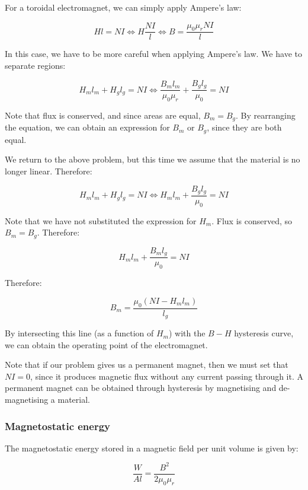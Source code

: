 \documentclass{article}
\begin{document}
\begin{example}
    For a toroidal electromagnet, we can simply apply Ampere's law:

    \[ Hl = NI \iff H \frac{NI}{l} \iff B = \frac{\mu_0\mu_r NI}{l} \]
\end{example}

\begin{example}
    In this case, we have to be more careful when applying Ampere's law. We have to separate regions:

    \[ H_ml_m + H_gl_g = NI \iff \frac{B_m l_m}{\mu_0\mu_r} + \frac{B_g l_g}{\mu_0} = NI \]

    Note that flux is conserved, and since areas are equal, $B_m = B_g$. By rearranging the equation, we can obtain an expression for $B_m$ or $B_g$, since they are both equal.
\end{example}

\begin{example}
    We return to the above problem, but this time we assume that the material is no longer linear. Therefore:

    \[ H_m l_m + H_g l_g = NI \iff H_m l_m + \frac{B_g l_g}{\mu_0} = NI \]

    Note that we have not substituted the expression for $H_m$. Flux is conserved, so $B_m = B_g$. Therefore:

    \[ H_m l_m + \frac{B_m l_g}{\mu_0} = NI \]

    Therefore:

    \[ B_m = \frac{\mu_0(NI - H_m l_m)}{l_g} \]

    By intersecting this line (as a function of $H_m$) with the $B-H$ hysteresis curve, we can obtain the operating point of the electromagnet.
\end{example}

Note that if our problem gives us a permanent magnet, then we must set that $NI = 0$, since it produces magnetic flux without any current passing through it. A permanent magnet can be obtained through hysteresis by magnetising and de-magnetising a material.

\subsubsection{Magnetostatic energy}

\begin{proposition}
    The magnetostatic energy stored in a magnetic field per unit volume is given by:

    \[ \frac{W}{Al} = \frac{B^2}{2\mu_0\mu_r} \]
\end{proposition}
\end{document}
